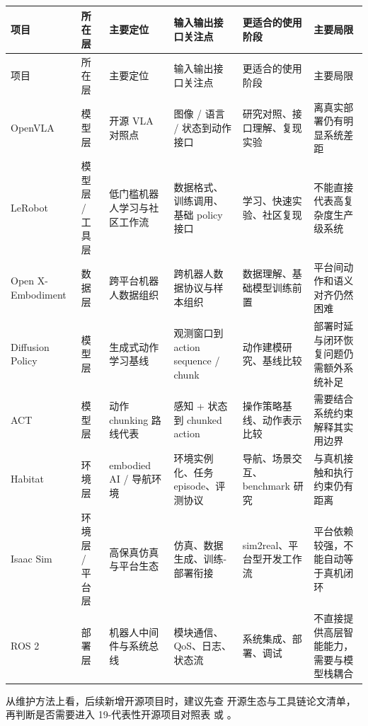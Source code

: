 \begingroup
\small
\begin{xltabular}{\textwidth}{YYYYYY}
\toprule
项目 & 所在层 & 主要定位 & 输入输出接口关注点 & 更适合的使用阶段 & 主要局限 \\
\midrule
\endfirsthead
\toprule
项目 & 所在层 & 主要定位 & 输入输出接口关注点 & 更适合的使用阶段 & 主要局限 \\
\midrule
\endhead
OpenVLA & 模型层 & 开源 VLA 对照点 & 图像 / 语言 / 状态到动作接口 & 研究对照、接口理解、复现实验 & 离真实部署仍有明显系统差距 \\
LeRobot & 模型层 / 工具层 & 低门槛机器人学习与社区工作流 & 数据格式、训练调用、基础 policy 接口 & 学习、快速实验、社区复现 & 不能直接代表高复杂度生产级系统 \\
Open X-Embodiment & 数据层 & 跨平台机器人数据组织 & 跨机器人数据协议与样本组织 & 数据理解、基础模型训练前置 & 平台间动作和语义对齐仍然困难 \\
Diffusion Policy & 模型层 & 生成式动作学习基线 & 观测窗口到 action sequence / chunk & 动作建模研究、基线比较 & 部署时延与闭环恢复问题仍需额外系统补足 \\
ACT & 模型层 & 动作 chunking 路线代表 & 感知 + 状态到 chunked action & 操作策略基线、动作表示比较 & 需要结合系统约束解释其实用边界 \\
Habitat & 环境层 & embodied AI / 导航环境 & 环境实例化、任务 episode、评测协议 & 导航、场景交互、benchmark 研究 & 与真机接触和执行约束仍有距离 \\
Isaac Sim & 环境层 / 平台层 & 高保真仿真与平台生态 & 仿真、数据生成、训练-部署衔接 & sim2real、平台型开发工作流 & 平台依赖较强，不能自动等于真机闭环 \\
ROS 2 & 部署层 & 机器人中间件与系统总线 & 模块通信、QoS、日志、状态流 & 系统集成、部署、调试 & 不直接提供高层智能能力，需要与模型栈耦合 \\
\bottomrule
\end{xltabular}
\endgroup

从维护方法上看，后续新增开源项目时，建议先查 开源生态与工具链论文清单，再判断是否需要进入 19-代表性开源项目对照表 或 。
